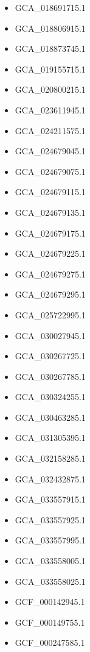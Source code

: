 \begin{itemize}
    \item GCA\_018691715.1
    \item GCA\_018806915.1
    \item GCA\_018873745.1
    \item GCA\_019155715.1
    \item GCA\_020800215.1
    \item GCA\_023611945.1
    \item GCA\_024211575.1
    \item GCA\_024679045.1
    \item GCA\_024679075.1
    \item GCA\_024679115.1
    \item GCA\_024679135.1
    \item GCA\_024679175.1
    \item GCA\_024679225.1
    \item GCA\_024679275.1
    \item GCA\_024679295.1
    \item GCA\_025722995.1
    \item GCA\_030027945.1
    \item GCA\_030267725.1
    \item GCA\_030267785.1
    \item GCA\_030324255.1
    \item GCA\_030463285.1
    \item GCA\_031305395.1
    \item GCA\_032158285.1
    \item GCA\_032432875.1
    \item GCA\_033557915.1
    \item GCA\_033557925.1
    \item GCA\_033557995.1
    \item GCA\_033558005.1
    \item GCA\_033558025.1
    \item GCF\_000142945.1
    \item GCF\_000149755.1
    \item GCF\_000247585.1
\end{itemize}
